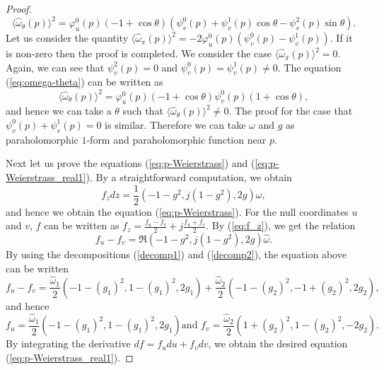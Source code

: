 \documentclass[11pt,reqno]{amsart}
\theoremstyle{plain} %
\theoremstyle{definition}
\begin{document}
\begin{proof}
\begin{equation}\label{eq:omega-theta}
\langle \hat{\omega}_{\theta}(p)\rangle^2=\varphi_u^0(p)(-1+\cos \theta)(\psi_v^0(p)+\psi_v^1(p)\cos \theta-\psi_v^2(p)\sin \theta).
\end{equation}
Let us consider the quantity $\langle \hat{\omega}_{\pi}(p)\rangle^2=-2\varphi_u^0(p)(\psi_v^0(p)-\psi_v^1(p))$. If it is non-zero then the proof is completed. We consider the case $\langle \hat{\omega}_{\pi}(p)\rangle^2=0$. Again, we can see that $\psi_v^2(p)=0$ and $\psi_v^0(p)=\psi_v^1(p)\neq 0$. The equation (\ref{eq:omega-theta}) can be written as
\begin{equation*}
\langle \hat{\omega}_{\theta}(p)\rangle^2=\varphi_u^0(p)(-1+\cos \theta)\psi_v^0(p)(1+\cos \theta),
\end{equation*}
and hence we can take a $\theta$ such that $\langle \hat{\omega}_{\theta}(p)\rangle^2\neq0$. The proof for the case that $\psi_v^0(p)+\psi_v^1(p)=0$ is similar. Therefore we can take $\omega$ and $g$ as paraholomorphic $1$-form and paraholomorphic function near $p$.


Next let us prove the equations (\ref{eq:p-Weierstrass}) and (\ref{eq:p-Weierstrass_real1}). By a straightforward computation, we obtain 
\begin{equation}\label{eq:f_z}
f_zdz=\frac{1}{2}(-1-g^2,j(1-g^2),2g)\omega,
\end{equation}
and hence we obtain the equation (\ref{eq:p-Weierstrass}). For the null coordinates $u$ and $v$, $f$ can be written as $f_z=\frac{f_u-f_v}{2}+j\frac{f_u+f_v}{2}$. By (\ref{eq:f_z}), we get the relation
\begin{equation*}
f_u-f_v=\Re(-1-g^2,j(1-g^2),2g)\hat{\omega}.
\end{equation*}
By using the decompositions (\ref{decomp1}) and (\ref{decomp2}), the equation above can be written
\begin{equation*}
  f_u-f_v=\frac{\hat{\omega}_1}{2}\left( -1-(g_1)^2,1-(g_1)^2, 2g_1 \right)+\frac{\hat{\omega}_2}{2}\left( -1-(g_2)^2,-1+(g_2)^2, 2g_2 \right),
\end{equation*}
and hence 
\begin{equation*}
  f_u=\frac{\hat{\omega}_1}{2}\left( -1-(g_1)^2,1-(g_1)^2, 2g_1 \right) \text{and } f_v=\frac{\hat{\omega}_2}{2}\left( 1+(g_2)^2,1-(g_2)^2, -2g_2 \right).
\end{equation*}
By integrating the derivative $df=f_udu+f_vdv$, we obtain the desired equation (\ref{eq:p-Weierstrass_real1}). 
\end{proof}
\end{document}
